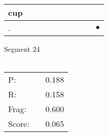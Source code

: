 \documentclass[landscape]{article}
\newcommand{\ssp}{\hspace{2pt}}
\newcommand{\mex}{\cellcolor{g}$\bullet$}
\begin{document}
\begin{tabular}{|l|p{10pt}|p{10pt}|p{10pt}|p{10pt}|p{10pt}|p{10pt}|p{10pt}|p{10pt}|p{10pt}|}
\hline
\ssp cup \ssp&\hspace{2pt}&\hspace{2pt}&\hspace{2pt}&\hspace{2pt}&\hspace{2pt}&\hspace{2pt}&\hspace{2pt}&\hspace{2pt}&\hspace{2pt}\\
\hline
\ssp \cellcolor{ref8}. \ssp&\hspace{2pt}&\hspace{2pt}&\hspace{2pt}&\hspace{2pt}&\hspace{2pt}&\hspace{2pt}&\hspace{2pt}&\hspace{2pt}&\hspace{2pt}\mex\\
\hline
\end{tabular}

\vspace{6pt}
\noindent Segment 24\\\\
\noindent\begin{tabular}{lm{12pt}r}
\hline
P:&&0.188\\
R:&&0.158\\
Frag:&&0.600\\
Score:&&0.065\\
\end{tabular}

\newpage
\end{document}
